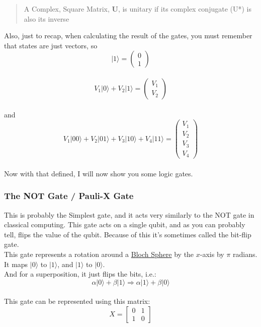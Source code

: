 \documentclass[../main.tex]{subfiles}
\begin{document}
\begin{quote}
A Complex, Square Matrix, \textbf{U}, is unitary if its complex conjugate
(U*) is also its inverse
\end{quote}

Also, just to recap, when calculating the result of the gates, you must
remember that states are just vectors, so\\
\[\lvert1\rangle =\left( \begin{matrix} 0\\ 1\end{matrix} \right)\]\\
\[
V_1\lvert0\rangle + V_2\lvert1\rangle =\left( \begin{matrix} V_1\\ V_2\end{matrix} \right)\]\\
and\\
\[
V_1\lvert00\rangle + V_2\lvert01\rangle + V_3\lvert10\rangle + V_4\lvert11\rangle =\left( \begin{matrix} V_1\\V_2\\V_3\\ V_4\end{matrix} \right)\]\\
Now with that defined, I will now show you some logic gates.

\subsubsection{The NOT Gate / Pauli-X Gate}

This is probably the Simplest gate, and it acts very similarly to the NOT gate in classical computing.
This gate acts on a single qubit, and as you can probably tell, flips the value of the qubit.
Because of this it's sometimes called the bit-flip gate.\\
This gate represents a rotation around a
\href{https://en.wikipedia.org/wiki/Bloch_sphere}{Bloch Sphere} by the
\(x\)-axis by \(\pi\) radians.\\
It maps \(\lvert0\rangle\) to \(\lvert1\rangle\), and \(\lvert1\rangle\) to
\(\lvert0\rangle\).\\
And for a superposition, it just flips the bits, i.e.:\\
\[
\alpha\lvert0\rangle + \beta\lvert1\rangle \Rightarrow \alpha\lvert1\rangle + \beta\lvert0\rangle\]\\
This gate can be represented using this matrix:\\
\begin{equation}
	X = \left[ \begin{matrix} 0 & 1\\1 & 0\end{matrix} \right]
\end{equation}
\end{document}
